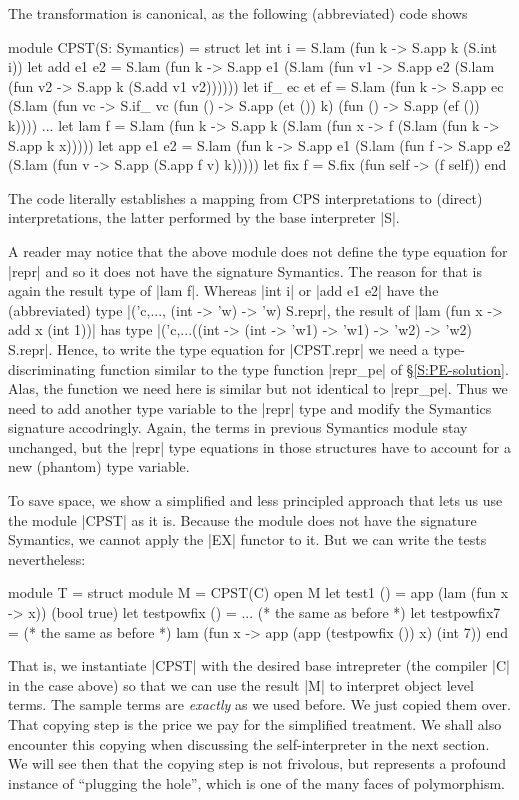 \documentclass[preprint]{sigplanconf}
\begin{document}
The transformation is canonical, as the following (abbreviated) code
shows
\begin{code}
module CPST(S: Symantics) = struct
  let int i = S.lam (fun k -> S.app k (S.int i))
  let add e1 e2 = S.lam (fun k ->
    S.app e1 (S.lam (fun v1 ->
    S.app e2 (S.lam (fun v2 -> S.app k (S.add v1 v2))))))
  let if_ ec et ef = S.lam (fun k ->
    S.app ec (S.lam (fun vc ->
    S.if_ vc (fun () -> S.app (et ()) k) (fun () -> S.app (ef ())
    k))))
  ...
  let lam f = S.lam (fun k -> S.app k (S.lam (fun x ->
    f (S.lam (fun k -> S.app k x)))))
  let app e1 e2 = S.lam (fun k -> 
    S.app e1 (S.lam (fun f ->
    S.app e2 (S.lam (fun v -> S.app (S.app f v) k)))))
  let fix f  = S.fix (fun self -> (f self))
end
\end{code}
The code literally establishes a mapping from CPS interpretations to
(direct) interpretations, the latter performed by 
the base interpreter |S|.

A reader may notice that the above module does not define the type
equation for |repr| and so it does not have the signature Symantics.
The reason for that is again the result type of |lam f|. Whereas
|int i| or |add e1 e2| have the (abbreviated) 
type |('c,..., (int -> 'w) -> 'w) S.repr|,
the result of |lam (fun x -> add x (int 1))| has type
|('c,...((int -> (int -> 'w1) -> 'w1) -> 'w2) -> 'w2) S.repr|. 
Hence, to write the type equation for |CPST.repr| we need a 
type-discriminating
function similar to the type function |repr_pe| of
\S\ref{S:PE-solution}. Alas, the function we need here is
similar but not identical to |repr_pe|. Thus we need to add 
another type variable to the |repr| type and modify the Symantics
signature accodringly. Again, the terms in previous Symantics module
stay unchanged, but the |repr| type equations in those structures have to
account for a new (phantom) type variable.

To save space, we show a simplified and less principled approach that
lets us use the module |CPST| as it is. Because the module does not
have the signature Symantics, we cannot apply the |EX| functor to it.
But we can write the tests nevertheless:
\begin{code}
module T = struct
 module M = CPST(C)
 open M
 let test1 () = app (lam (fun x -> x)) (bool true)
 let testpowfix () = ... (* the same as before *)
 let testpowfix7 = (* the same as before *)
    lam (fun x -> app (app (testpowfix ()) x) (int 7))
end
\end{code}
That is, we instantiate |CPST| with the desired base intrepreter (the
compiler |C| in the case above) so that we can use the result |M| to
interpret object level terms. The sample terms are \emph{exactly}
as we used before. We just copied them over. That copying step is the
price we pay for the simplified treatment. We shall also encounter this
copying when discussing the self-interpreter in the next section. We
will see then that the copying step is not frivolous, but represents
a profound instance of 
``plugging the hole'', which is one of the many faces of polymorphism.
\end{document}
